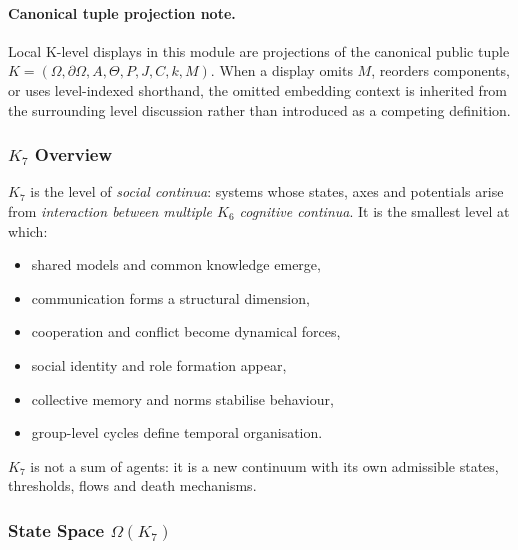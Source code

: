 



\paragraph{Canonical tuple projection note.}
Local K-level displays in this module are projections of the canonical public tuple \(K=(\Omega,\partial\Omega,A,\Theta,P,J,C,k,M)\). When a display omits \(M\), reorders components, or uses level-indexed shorthand, the omitted embedding context is inherited from the surrounding level discussion rather than introduced as a competing definition.

\subsubsection{\texorpdfstring{$K_7$}{K_7} Overview}
\label{sec:k7-overview}

$K_7$ is the level of \emph{social continua}: systems whose states,
axes and potentials arise from \emph{interaction between multiple $K_6$
cognitive continua}. It is the smallest level at which:

\begin{itemize}
    \item shared models and common knowledge emerge,
    \item communication forms a structural dimension,
    \item cooperation and conflict become dynamical forces,
    \item social identity and role formation appear,
    \item collective memory and norms stabilise behaviour,
    \item group-level cycles define temporal organisation.
\end{itemize}

$K_7$ is not a sum of agents: it is a new continuum with its own
admissible states, thresholds, flows and death mechanisms.

\subsubsection{State Space \texorpdfstring{$\Omega(K_7)$}{\Omega(K_7)}}

